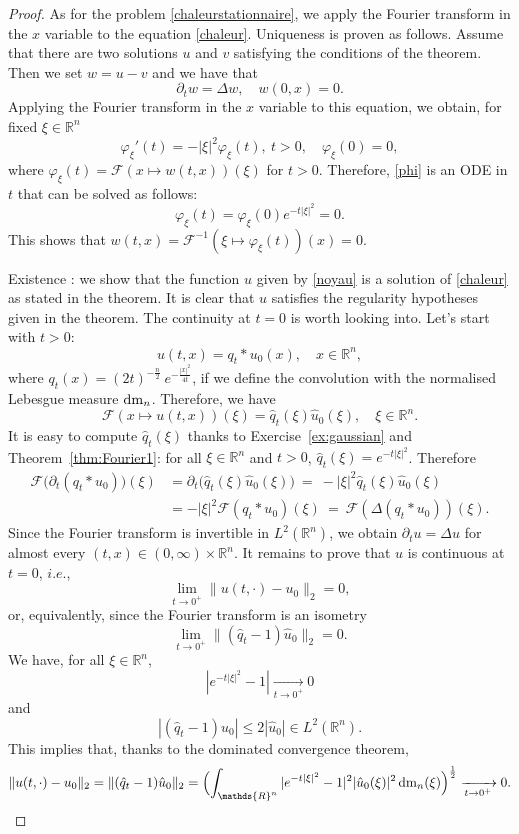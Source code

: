 \documentclass[a4paper, 12pt]{article}
\theoremstyle{plain}
\theoremstyle{definition}
\theoremstyle{remark}
\numberwithin{equation}{section}
\begin{document}
\begin{proof}
As for the problem \eqref{chaleurstationnaire}, we apply the Fourier transform in the $x$ variable to the equation \eqref{chaleur}. 
Uniqueness is proven as follows. Assume that there are two solutions $u$ and $v$ satisfying the conditions of the theorem. Then
we set $w=u-v$ and we have that
\[
\partial_t w = \Delta w, \quad w(0,x) = 0.  
\]
Applying the Fourier transform in the $x$ variable to this equation, we obtain, for fixed $\xi\in{\mathds{R}}^n$
%
\begin{equation} 
\label{phi}
\varphi_\xi'(t) = -|\xi|^2 \varphi_\xi (t), \ t>0, \quad \varphi_\xi(0) = 0,
\end{equation}
%
where $\varphi_\xi (t) = {\mathscr{F}} (x \mapsto w(t,x))(\xi)$ for $t>0$. Therefore, \eqref{phi} is an ODE in $t$ that
can be solved as follows:
\[
\varphi_\xi(t) = \varphi_\xi(0) e^{-t|\xi|^2} = 0.
\]
This shows that $w(t,x) = {\mathscr{F}}^{-1} (\xi \mapsto \varphi_\xi(t))(x) = 0$.

\noindent
Existence : we show that the function $u$ given by \eqref{noyau} is a solution of \eqref{chaleur} as stated in the theorem. 
It is clear that $u$ satisfies the regularity hypotheses given in the theorem. The continuity at $t=0$ is worth looking into. Let's start 
with $t>0$:
\[
u(t,x) = q_t * u_0 (x), \quad x \in {\mathds{R}}^n,
\]
where $q_t (x) =(2t)^{- \frac{n}{2}} \ e^{-\frac{|x|^2}{4t}}$, if we define the convolution with the normalised Lebesgue measure ${\rm dm}_n$. 
Therefore, we have 
\[
{\mathscr{F}}(x \mapsto u(t,x))(\xi) = \hat{q}_t(\xi) \hat{u}_0(\xi), \quad \xi\in{\mathds{R}}^n.
\]
It is easy to compute $\hat{q}_t(\xi)$ thanks to Exercise~\ref{ex:gaussian} and Theorem~\ref{thm:Fourier1}:
for all $\xi \in {\mathds{R}}^n$ and $t>0$, $\hat{q}_t(\xi) = e^{-t|\xi|^2}$. Therefore
%
\begin{align*}
{\mathscr{F}} \bigl(\partial_t (q_t * u_0 ) \bigr)(\xi) &=  \partial_t \bigl(\hat{q}_t(\xi) \hat{u}_0(\xi) \bigr) \ =\  -|\xi|^2 \hat{q}_t(\xi) \hat{u}_0(\xi) \\
&=  -|\xi|^2 {\mathscr{F}} (q_t * u_0 ) (\xi) \ = \ {\mathscr{F}} (\Delta (q_t * u_0 ))(\xi).
\end{align*}
%
Since the Fourier transform is invertible in $L^2({\mathds{R}}^n)$, we obtain $\partial_t u = \Delta u$ for almost every
$(t,x)\in(0,\infty)\times{\mathds{R}}^n$. It remains to prove that $u$ is continuous at $t=0$, $i.e.$,
\[
\lim_{t\to 0^+} \| u(t,\cdot) - u_0\|_2 = 0,
\]
or, equivalently, since the Fourier transform is an isometry
\[
\lim_{t\to 0^+} \| (\hat{q}_t -1) \hat{u}_0\|_2 = 0.
\]
We have, for all $\xi\in{\mathds{R}}^n$,
\[
|e^{-t|\xi|^2} - 1| \xrightarrow[t\to 0^+]{} 0
\]
and
\[
|(\hat{q}_t -1) \hat{u}_0|\le 2 |\hat{u}_0|\in L^2({\mathds{R}}^n).
\]
This implies that, thanks to the dominated convergence theorem, 
\[
\| u(t,\cdot) - u_0\|_2 = \| (\hat{q}_t -1) \hat{u}_0\|_2 
=\Bigl(\int_{{\mathds{R}}^n} |e^{-t|\xi|^2} - 1|^2 |\hat{u}_0(\xi)|^2\,{\rm dm}_n(\xi) \Bigr)^{\frac{1}{2}}\xrightarrow[t\to 0^+]{} 0. \qedhere
\]
\end{proof}
\end{document}
